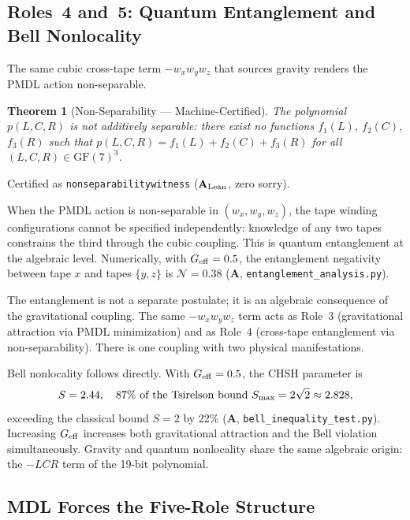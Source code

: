 \documentclass[11pt]{article}
\newtheorem{theorem}{Theorem}[section]
\theoremstyle{remark}
\newcommand{\lean}[1]{%
  \penalty-100
  \begingroup\def\_{\textunderscore\allowbreak}\texttt{#1}\endgroup}
\newcommand{\CatA}{\textbf{A}}
\newcommand{\CatAL}{\ensuremath{\textbf{A}_{\rm Lean}}}
\newcommand{\FF}{\mathrm{GF}}
\begin{document}
\subsection{Roles~4 and~5: Quantum Entanglement and Bell Nonlocality}
\label{sec:role-quantum}

The same cubic cross-tape term $-w_x w_y w_z$ that sources gravity
renders the PMDL action non-separable.

\begin{theorem}[Non-Separability --- Machine-Certified]
\label{thm:nonsep}
The polynomial $p(L,C,R)$ is not additively separable: there exist
no functions $f_1(L)$, $f_2(C)$, $f_3(R)$ such that
$p(L,C,R) = f_1(L)+f_2(C)+f_3(R)$ for all $(L,C,R) \in \FF(7)^3$.
\end{theorem}
Certified as \lean{non\_separability\_witness} ($\CatAL$, zero sorry).

When the PMDL action is non-separable in $(w_x, w_y, w_z)$, the tape
winding configurations cannot be specified independently: knowledge
of any two tapes constrains the third through the cubic coupling.
This is quantum entanglement at the algebraic level.  Numerically,
with $G_{\rm eff} = 0.5$, the entanglement negativity between tape
$x$ and tapes $\{y,z\}$ is $\mathcal{N} = 0.38$ ($\CatA$,
\texttt{entanglement\_analysis.py}).

The entanglement is not a separate postulate; it is an algebraic
consequence of the gravitational coupling.  The same $-w_x w_y w_z$
term acts as Role~3 (gravitational attraction via PMDL minimization)
and as Role~4 (cross-tape entanglement via non-separability).  There
is one coupling with two physical manifestations.

Bell nonlocality follows directly.  With $G_{\rm eff} = 0.5$, the
CHSH parameter is
\begin{equation}
  S = 2.44, \quad\text{87\% of the Tsirelson bound } S_{\rm max} =
  2\sqrt{2} \approx 2.828,
\end{equation}
exceeding the classical bound $S = 2$ by 22\% ($\CatA$,
\texttt{bell\_inequality\_test.py}).
Increasing $G_{\rm eff}$ increases both gravitational attraction and
the Bell violation simultaneously.  Gravity and quantum nonlocality
share the same algebraic origin: the $-LCR$ term of the 19-bit
polynomial.

\subsection{MDL Forces the Five-Role Structure}
\label{sec:mdl-forces}
\end{document}
